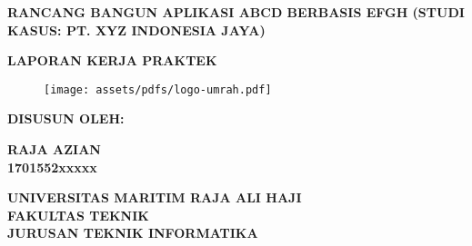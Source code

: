 \begin{titlepage}
    \thispagestyle{empty}
    \begin{center}
        \begin{large}\begin{spacing}{1}
                \textbf{RANCANG BANGUN APLIKASI ABCD BERBASIS EFGH (STUDI KASUS: PT. XYZ INDONESIA JAYA)}
            \end{spacing}\end{large}

        \vspace{2cm}
        \textbf{LAPORAN KERJA PRAKTEK}

        \vspace{1cm}
        \begin{figure}[h]
            \centering
            \texttt{[image: assets/pdfs/logo-umrah.pdf]}
            \label{fig:universitylogo}
        \end{figure}

        \vspace{1cm}
        \textbf{DISUSUN OLEH:}

        \vspace{1cm}
        \textbf{RAJA AZIAN \\
            1701552xxxxx}

        \vspace{2cm}
        \textbf{UNIVERSITAS MARITIM RAJA ALI HAJI\\
            FAKULTAS TEKNIK\\
            JURUSAN TEKNIK INFORMATIKA\\}

        \vspace{\baselineskip}
        \textbf{\large \the\year{}}
    \end{center}
\end{titlepage}
